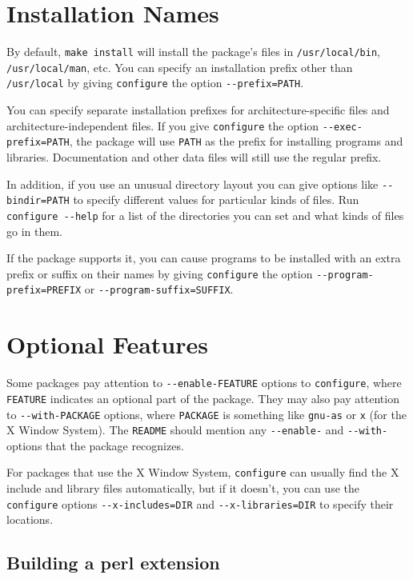 \section*{Installation Names}


   By default, \verb+make install+ will install the package's files in
\verb+/usr/local/bin+, \verb+/usr/local/man+, etc.  You can specify an
installation prefix other than \verb+/usr/local+ by giving \verb+configure+ the
option \verb+--prefix=PATH+.

   You can specify separate installation prefixes for
architecture-specific files and architecture-independent files.  If you
give \verb+configure+ the option \verb+--exec-prefix=PATH+, the package will use
\verb+PATH+ as the prefix for installing programs and libraries.
Documentation and other data files will still use the regular prefix.

   In addition, if you use an unusual directory layout you can give
options like \verb+--bindir=PATH+ to specify different values for particular
kinds of files.  Run \verb+configure --help+ for a list of the directories
you can set and what kinds of files go in them.

   If the package supports it, you can cause programs to be installed
with an extra prefix or suffix on their names by giving \verb+configure+ the
option \verb+--program-prefix=PREFIX+ or \verb+--program-suffix=SUFFIX+.

\section*{Optional Features}


   Some packages pay attention to \verb+--enable-FEATURE+ options to
\verb+configure+, where \verb+FEATURE+ indicates an optional part of the package.
They may also pay attention to \verb+--with-PACKAGE+ options, where \verb+PACKAGE+
is something like \verb+gnu-as+ or \verb+x+ (for the X Window System).  The
\verb+README+ should mention any \verb+--enable-+ and \verb+--with-+ options that the
package recognizes.

   For packages that use the X Window System, \verb+configure+ can usually
find the X include and library files automatically, but if it doesn't,
you can use the \verb+configure+ options \verb+--x-includes=DIR+ and
\verb+--x-libraries=DIR+ to specify their locations.


\subsection*{Building a perl extension}


